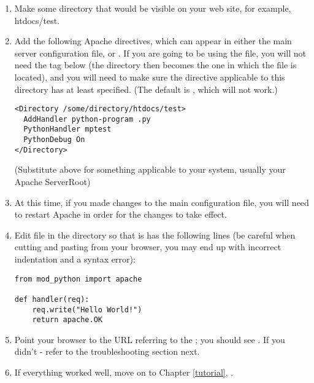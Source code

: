 \begin{enumerate}

\item
Make some directory that would be visible on your web site, for
example, htdocs/test.

\item
Add the following Apache directives, which can appear in either the
main server configuration file, or .  If you are
going to be using the  file, you will not need the
 tag below (the directory then becomes the one in
which the  file is located), and you will need to
make sure the  directive applicable to this
directory has at least  specified. (The default is
, which will not work.)

\begin{verbatim}
<Directory /some/directory/htdocs/test> 
  AddHandler python-program .py
  PythonHandler mptest 
  PythonDebug On 
</Directory>
\end{verbatim}

(Substitute  above for something applicable to
your system, usually your Apache ServerRoot)

\item
At this time, if you made changes to the main configuration file, you
will need to restart Apache in order for the changes to take effect.

\item
Edit  file in the  directory so
that is has the following lines (be careful when cutting and pasting
from your browser, you may end up with incorrect indentation and a
syntax error):

\begin{verbatim}
from mod_python import apache

def handler(req):
    req.write("Hello World!")
    return apache.OK 
\end{verbatim}

\item
Point your browser to the URL referring to the ; you
should see . If you didn't - refer to the
troubleshooting section next.

\item
If everything worked well, move on to Chapter \ref{tutorial}, 
. 

\end{enumerate}

